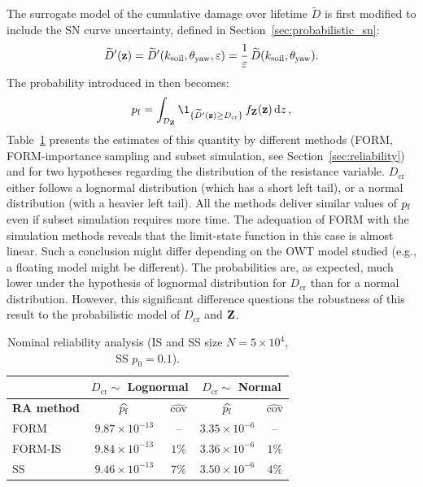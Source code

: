 The surrogate model of the cumulative damage over lifetime $\widetilde{D}$ is first modified to include the SN curve uncertainty, defined in Section~\ref{sec:probabilistic_sn}:
\begin{equation}
    \widetilde{D}'({\bf z}) = \widetilde{D}'(k_{\mathrm{soil}}, \theta_{\mathrm{yaw}}, \varepsilon) = \frac1\varepsilon \, \widetilde{D}(k_{\mathrm{soil}}, \theta_{\mathrm{yaw}}).
\end{equation} 
The probability introduced in  then becomes: 
\begin{equation}
    \pf = \int_{\iD_\bZ} \1_{\{\widetilde{D}'(\bz) \geq D_{\mathrm{cr}}\}} \, f_\bZ(\bz) \, \dd z \,,
    \label{eq:owt_pf_surrogate}
\end{equation}
Table~\ref{tab:pf_result_table} presents the estimates of this quantity by different methods (FORM, FORM-importance sampling and subset simulation, see Section~\ref{sec:reliability}) and for two hypotheses regarding the distribution of the resistance variable. 
$D_{\mathrm{cr}}$ either follows a lognormal distribution (which has a short left tail), or a normal distribution (with a heavier left tail). 
All the methods deliver similar values of $p_\mathrm{f}$ even if subset simulation requires more time. 
The adequation of FORM with the simulation methods reveals that the limit-state function in this case is almost linear. 
Such a conclusion might differ depending on the OWT model studied (e.g., a floating model might be different). 
The probabilities are, as expected, much lower under the hypothesis of lognormal distribution for $D_{\mathrm{cr}}$ than for a normal distribution. 
However, this significant difference questions the robustness of this result to the probabilistic model of $D_{\mathrm{cr}}$ and ${\bf Z}$.  

\begin{table}[h]
    \centering
    \caption{Nominal reliability analysis (IS and SS size $N=5 \times 10^4$, SS $p_0=0.1$).}
    \begin{tabular}{l||c|c|c|c}
              &  \multicolumn{2}{c|}{$D_{\mathrm{cr}} \sim $ \bf Lognormal} & \multicolumn{2}{c}{$D_{\mathrm{cr}} \sim $ \bf Normal}\\
    \hline
    \bf RA method & $\widehat{p_\mathrm{f}}$       & $\widehat{\mathrm{cov}}$    & $\widehat{p_\mathrm{f}}$       & $\widehat{\mathrm{cov}}$ \\
    \hline\hline
    FORM      & $9.87 \times 10^{-13}$ & --                    & $3.35 \times 10^{-6}$ & --\\
    \hline
    FORM-IS   & $9.84 \times 10^{-13}$ & $1 \%$                & $3.36 \times 10^{-6}$ & $1 \%$\\
    \hline
    SS        & $9.46 \times 10^{-13}$ & $7 \%$               & $3.50 \times 10^{-6}$ & $4 \%$\\ 
    \end{tabular}
    \label{tab:pf_result_table}
\end{table}


